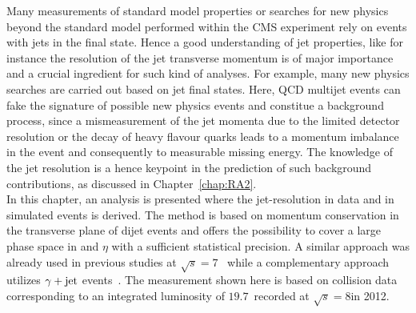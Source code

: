 Many measurements of standard model properties or searches for new physics beyond the standard model performed within the CMS experiment rely on events with jets in the final state. Hence a good understanding of jet properties, like for instance the resolution of the jet transverse momentum is of major importance and a crucial ingredient for such kind of analyses. For example, many new physics searches are carried out based on jet final states. Here, QCD multijet events can fake the signature of possible new physics events and constitue a background process, since a mismeasurement of the jet momenta due to the limited detector resolution or the decay of heavy flavour quarks leads to a momentum imbalance in the event and consequently to measurable missing energy. The knowledge of the jet resolution is a hence keypoint in the prediction of such background contributions, as discussed in Chapter~\ref{chap:RA2}. \\
In this chapter, an analysis is presented where the jet-\pt resolution in data and in simulated events is derived. The method is based on momentum conservation in the transverse plane of dijet events and offers the possibility to cover a large phase space in \pt and $\eta$ with a sufficient statistical precision. A similar approach was already used in previous studies at $\sqrt{s}=7$\tev~\cite{1748-0221-6-11-P11002, thesis:Schroeder} while a complementary approach utilizes $\gamma +\rm{jet}$ events~\cite{CMS-AN-2010-141, CMS-AN-2011-004, CMS-AN-2013-179}. The measurement shown here is based on collision data corresponding to an integrated luminosity of $19.7$~\fbinv recorded at $\sqrt{s}=8$\tev in 2012.
